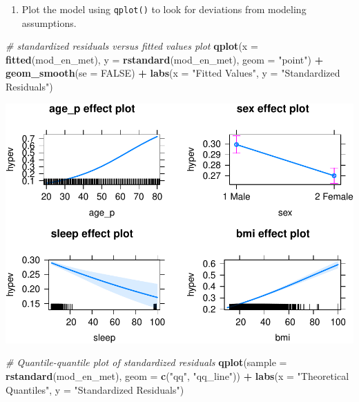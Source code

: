 \documentclass[
]{book}
\newenvironment{Shaded}{\begin{snugshade}}{\end{snugshade}}
\newcommand{\CommentTok}[1]{\textcolor[rgb]{0.56,0.35,0.01}{\textit{#1}}}
\newcommand{\DataTypeTok}[1]{\textcolor[rgb]{0.13,0.29,0.53}{#1}}
\newcommand{\KeywordTok}[1]{\textcolor[rgb]{0.13,0.29,0.53}{\textbf{#1}}}
\newcommand{\NormalTok}[1]{#1}
\newcommand{\OperatorTok}[1]{\textcolor[rgb]{0.81,0.36,0.00}{\textbf{#1}}}
\newcommand{\OtherTok}[1]{\textcolor[rgb]{0.56,0.35,0.01}{#1}}
\newcommand{\StringTok}[1]{\textcolor[rgb]{0.31,0.60,0.02}{#1}}
\providecommand{\tightlist}{%
  \setlength{\itemsep}{0pt}\setlength{\parskip}{0pt}}
\begin{document}
\begin{alert}
\begin{enumerate}
\def\labelenumi{\arabic{enumi}.}
\setcounter{enumi}{2}
\tightlist
\item
  Plot the model using \texttt{qplot()} to look for deviations from modeling assumptions.
\end{enumerate}

\begin{Shaded}
\begin{Highlighting}[]
    \CommentTok{\# standardized residuals versus fitted values plot}
  \KeywordTok{qplot}\NormalTok{(}\DataTypeTok{x =} \KeywordTok{fitted}\NormalTok{(mod\_en\_met), }\DataTypeTok{y =} \KeywordTok{rstandard}\NormalTok{(mod\_en\_met), }\DataTypeTok{geom =} \StringTok{"point"}\NormalTok{) }\OperatorTok{+}
\StringTok{      }\KeywordTok{geom\_smooth}\NormalTok{(}\DataTypeTok{se =} \OtherTok{FALSE}\NormalTok{) }\OperatorTok{+}
\StringTok{      }\KeywordTok{labs}\NormalTok{(}\DataTypeTok{x =} \StringTok{"Fitted Values"}\NormalTok{, }\DataTypeTok{y =} \StringTok{"Standardized Residuals"}\NormalTok{)}
\end{Highlighting}
\end{Shaded}

\includegraphics{R/Rmodels/figures/unnamed-chunk-110-1.pdf}

\begin{Shaded}
\begin{Highlighting}[]
  \CommentTok{\# Quantile{-}quantile plot of standardized residuals}
  \KeywordTok{qplot}\NormalTok{(}\DataTypeTok{sample =} \KeywordTok{rstandard}\NormalTok{(mod\_en\_met), }\DataTypeTok{geom =} \KeywordTok{c}\NormalTok{(}\StringTok{"qq"}\NormalTok{, }\StringTok{"qq\_line"}\NormalTok{)) }\OperatorTok{+}\StringTok{ }
\StringTok{      }\KeywordTok{labs}\NormalTok{(}\DataTypeTok{x =} \StringTok{"Theoretical Quantiles"}\NormalTok{, }\DataTypeTok{y =} \StringTok{"Standardized Residuals"}\NormalTok{)}
\end{Highlighting}
\end{Shaded}


\end{alert}
\end{document}
